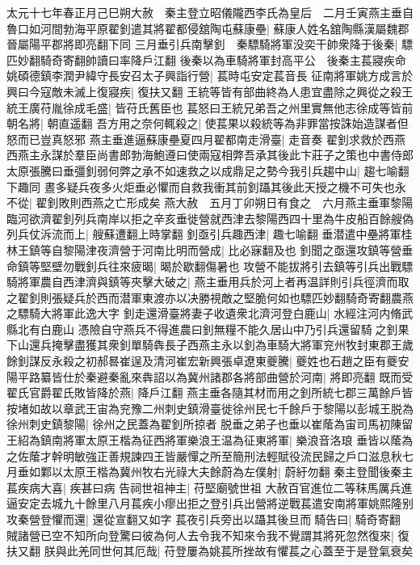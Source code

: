 太元十七年春正月己巳朔大赦　秦主登立昭儀隴西李氏為皇后　二月壬寅燕主垂自魯口如河間勃海平原翟釗遣其將翟都侵舘陶屯蘇康壘|{
	蘇康人姓名舘陶縣漢屬魏郡晉屬陽平郡將即亮翻下同}
三月垂引兵南擊釗　秦驃騎將軍没奕干帥衆降于後秦|{
	驃匹妙翻騎奇寄翻帥讀曰率降戶江翻}
後秦以為車騎將軍封高平公　後秦主萇寢疾命姚碩德鎮李潤尹緯守長安召太子興詣行營|{
	萇時屯安定萇音長}
征南將軍姚方成言於興曰今寇敵未滅上復寢疾|{
	復扶又翻}
王統等皆有部曲終為人患宜盡除之興從之殺王統王廣苻胤徐成毛盛|{
	皆苻氏舊臣也}
萇怒曰王統兄弟吾之州里實無他志徐成等皆前朝名將|{
	朝直遥翻}
吾方用之奈何輒殺之|{
	使萇果以殺統等為非罪當按誅始造謀者但怒而已豈真怒邪}
燕主垂進逼蘇康壘夏四月翟都南走滑臺|{
	走音奏}
翟釗求救於西燕西燕主永謀於羣臣尚書郎勃海鮑遵曰使兩寇相弊吾承其後此卞莊子之策也中書侍郎太原張騰曰垂彊釗弱何弊之承不如速救之以成鼎足之勢今我引兵趨中山|{
	趨七喻翻下趣同}
晝多疑兵夜多火炬垂必懼而自救我衝其前釗躡其後此天授之機不可失也永不從|{
	翟釗敗則西燕之亡形成矣}
燕大赦　五月丁卯朔日有食之　六月燕主垂軍黎陽臨河欲濟翟釗列兵南岸以拒之辛亥垂徙營就西津去黎陽西四十里為牛皮船百餘艘偽列兵仗泝流而上|{
	艘蘇遭翻上時掌翻}
釗亟引兵趣西津|{
	趣七喻翻}
垂潜遣中壘將軍桂林王鎮等自黎陽津夜濟營于河南比明而營成|{
	比必寐翻及也}
釗聞之亟還攻鎮等營垂命鎮等堅壁勿戰釗兵往來疲暍|{
	暍於歇翻傷暑也}
攻營不能拔將引去鎮等引兵出戰驃騎將軍農自西津濟與鎮等夾擊大破之|{
	燕主垂用兵於河上者再温詳則引兵徑濟而取之翟釗則張疑兵於西而潜軍東渡亦以决勝視敵之堅脆何如也驃匹妙翻騎奇寄翻農燕之驃騎大將軍此逸大字}
釗走還滑臺將妻子收遺衆北濟河登白鹿山|{
	水經注河内脩武縣北有白鹿山}
憑險自守燕兵不得進農曰釗無糧不能久居山中乃引兵還留騎之釗果下山還兵掩擊盡獲其衆釗單騎犇長子西燕主永以釗為車騎大將軍兖州牧封東郡王歲餘釗謀反永殺之初郝晷崔逞及清河崔宏新興張卓遼東夔騰|{
	夔姓也石趙之臣有夔安}
陽平路纂皆仕於秦避秦亂來犇詔以為冀州諸郡各將部曲營於河南|{
	將即亮翻}
既而受翟氏官爵翟氏敗皆降於燕|{
	降戶江翻}
燕主垂各隨其材而用之釗所統七郡三萬餘戶皆按堵如故以章武王宙為兖豫二州刺史鎮滑臺徙徐州民七千餘戶于黎陽以彭城王脱為徐州刺史鎮黎陽|{
	徐州之民蓋為翟釗所掠者}
脱垂之弟子也垂以崔䕃為宙司馬初陳留王紹為鎮南將軍太原王楷為征西將軍樂浪王温為征東將軍|{
	樂浪音洛琅}
垂皆以䕃為之佐䕃才幹明敏強正善規諫四王皆嚴憚之所至簡刑法輕賦役流民歸之戶口滋息秋七月垂如鄴以太原王楷為冀州牧右光祿大夫餘蔚為左僕射|{
	蔚紆勿翻}
秦主登聞後秦主萇疾病大喜|{
	疾甚曰病}
告祠世祖神主|{
	苻堅廟號世祖}
大赦百官進位二等秣馬厲兵進逼安定去城九十餘里八月萇疾小瘳出拒之登引兵出營將逆戰萇遣安南將軍姚熙隆别攻秦營登懼而還|{
	還從宣翻又如字}
萇夜引兵旁出以躡其後旦而騎告曰|{
	騎奇寄翻}
賊諸營已空不知所向登驚曰彼為何人去令我不知來令我不覺謂其將死忽然復來|{
	復扶又翻}
朕與此羌同世何其厄哉|{
	苻登屢為姚萇所挫故有懼萇之心蓋至于是登氣衰矣}
